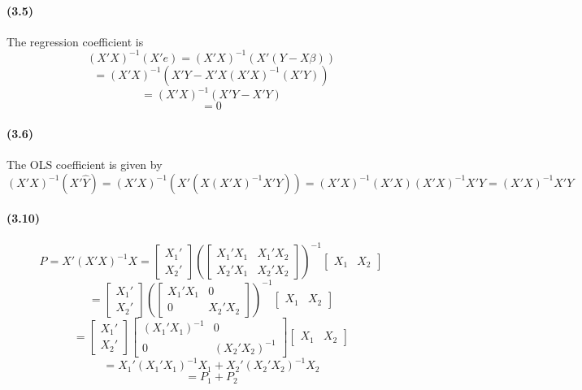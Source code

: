 \documentclass[10pt,letter]{article}
\begin{document}
\paragraph{(3.5)}
The regression coefficient is
\[ (X'X)^{-1}(X'e) = (X'X)^{-1}(X'(Y - X\beta))  \]
\[ = (X'X)^{-1}(X'Y - X'X(X'X)^{-1}(X'Y)) \]
\[ = (X'X)^{-1}(X'Y - X'Y) \]
\[ = 0 \]
\paragraph{(3.6)}
The OLS coefficient is given by
\[ (X'X)^{-1} (X'\hat{Y}) = (X'X)^{-1} (X'(X(X'X)^{-1}X'Y)) = (X'X)^{-1} (X'X)(X'X)^{-1}X'Y = (X'X)^{-1}X'Y \]
\paragraph{(3.10)}
\[ P = X'(X'X)^{-1}X = \begin{bmatrix}X_1'\\X_2'\end{bmatrix}\left(\begin{bmatrix}X_1'X_1 & X_1'X_2 \\ X_2'X_1 & X_2'X_2 \end{bmatrix}\right)^{-1}\begin{bmatrix}X_1 & X_2\end{bmatrix} \]
\[= \begin{bmatrix}X_1'\\X_2'\end{bmatrix}\left(\begin{bmatrix}X_1'X_1 & 0 \\ 0 & X_2'X_2 \end{bmatrix}\right)^{-1}\begin{bmatrix}X_1 & X_2\end{bmatrix} \]
\[= \begin{bmatrix}X_1'\\X_2'\end{bmatrix}\begin{bmatrix}(X_1'X_1)^{-1} & 0 \\ 0 & (X_2'X_2)^{-1} \end{bmatrix}\begin{bmatrix}X_1 & X_2\end{bmatrix} \]
\[= X_1'(X_1'X_1)^{-1}X_1 + X_2'(X_2'X_2)^{-1}X_2\]
\[ = P_1 + P_2 \]
\end{document}
